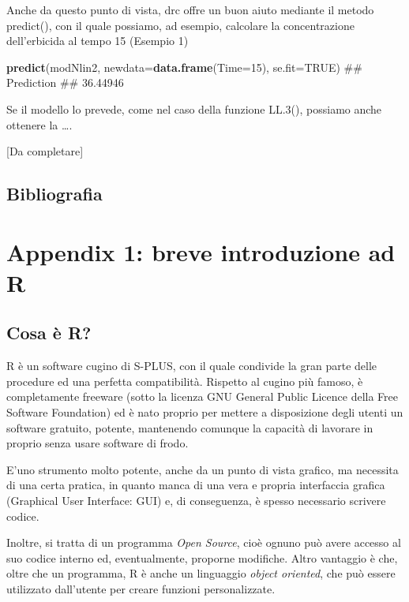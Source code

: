 \documentclass[a4paper,12pt,oneside]{book}
\newenvironment{Shaded}{\begin{snugshade}}{\end{snugshade}}
\newcommand{\KeywordTok}[1]{\textcolor[rgb]{0.13,0.29,0.53}{\textbf{#1}}}
\newcommand{\DataTypeTok}[1]{\textcolor[rgb]{0.13,0.29,0.53}{#1}}
\newcommand{\DecValTok}[1]{\textcolor[rgb]{0.00,0.00,0.81}{#1}}
\newcommand{\OtherTok}[1]{\textcolor[rgb]{0.56,0.35,0.01}{#1}}
\newcommand{\NormalTok}[1]{#1}
\theoremstyle{definition}
\theoremstyle{definition}
\theoremstyle{definition}
\theoremstyle{remark}
\begin{document}
Anche da questo punto di vista, drc offre un buon aiuto mediante il
metodo predict(), con il quale possiamo, ad esempio, calcolare la
concentrazione dell'erbicida al tempo 15 (Esempio 1)

\begin{Shaded}
\begin{Highlighting}[]
\KeywordTok{predict}\NormalTok{(modNlin2, }\DataTypeTok{newdata=}\KeywordTok{data.frame}\NormalTok{(}\DataTypeTok{Time=}\DecValTok{15}\NormalTok{), }\DataTypeTok{se.fit=}\OtherTok{TRUE}\NormalTok{)}
\NormalTok{## Prediction }
\NormalTok{##   36.44946}
\end{Highlighting}
\end{Shaded}

Se il modello lo prevede, come nel caso della funzione LL.3(), possiamo
anche ottenere la \ldots{}.

{[}Da completare{]}

\section{Bibliografia}\label{bibliografia}

\chapter*{Appendix 1: breve introduzione ad
R}\label{appendix-1-breve-introduzione-ad-r}

\section*{Cosa è R?}\label{cosa-e-r}

R è un software cugino di S-PLUS, con il quale condivide la gran parte
delle procedure ed una perfetta compatibilità. Rispetto al cugino più
famoso, è completamente freeware (sotto la licenza GNU General Public
Licence della Free Software Foundation) ed è nato proprio per mettere a
disposizione degli utenti un software gratuito, potente, mantenendo
comunque la capacità di lavorare in proprio senza usare software di
frodo.

E'uno strumento molto potente, anche da un punto di vista grafico, ma
necessita di una certa pratica, in quanto manca di una vera e propria
interfaccia grafica (Graphical User Interface: GUI) e, di conseguenza, è
spesso necessario scrivere codice.

Inoltre, si tratta di un programma \emph{Open Source}, cioè ognuno può
avere accesso al suo codice interno ed, eventualmente, proporne
modifiche. Altro vantaggio è che, oltre che un programma, R è anche un
linguaggio \emph{object oriented}, che può essere utilizzato dall'utente
per creare funzioni personalizzate.
\end{document}
